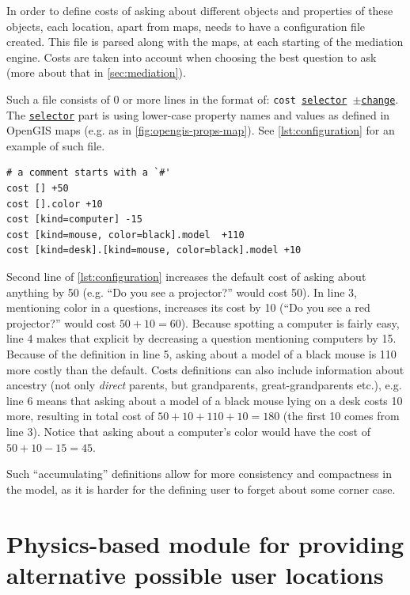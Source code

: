 In order to define costs of asking about different objects and properties of these objects, each location, apart from maps, needs to have a configuration file created. This file is parsed along with the maps, at each starting of the mediation engine. Costs are taken into account when choosing the best question to ask (more about that in \cref{sec:mediation}).

Such a file consists of 0 or more lines in the format of: \texttt{cost \underline{selector} $\pm$\underline{change}}. The \texttt{\underline{selector}} part is using lower-case property names and values as defined in OpenGIS maps (e.g. as in \cref{fig:opengis-props-map}). See \cref{lst:configuration} for an example of such file.

\begin{lstlisting}[caption={Definition of costs in a sample configuration file.},label=lst:configuration]
# a comment starts with a `#'
cost [] +50
cost [].color +10
cost [kind=computer] -15
cost [kind=mouse, color=black].model  +110
cost [kind=desk].[kind=mouse, color=black].model +10
\end{lstlisting}

Second line of \cref{lst:configuration} increases the default cost of asking about anything by 50 (e.g. ``Do you see a projector?'' would cost 50). In line 3, mentioning color in a questions, increases its cost by 10 (``Do you see a red projector?'' would cost $50+10=60$). Because spotting a computer is fairly easy, line 4 makes that explicit by decreasing a question mentioning computers by 15. Because of the definition in line 5, asking about a model of a black mouse is 110 more costly than the default. Costs definitions can also include information about ancestry (not only \emph{direct} parents, but grandparents, great-grandparents etc.), e.g. line 6 means that asking about a model of a black mouse lying on a desk costs 10 more, resulting in total cost of $50+10+110+10=180$ (the first 10 comes from line 3). Notice that asking about a computer's color would have the cost of $50+10-15=45$.

Such ``accumulating'' definitions allow for more consistency and compactness in the model, as it is harder for the defining user to forget about some corner case.

\section{Physics-based module for providing alternative possible user locations}
\label{sec:physics-module}

